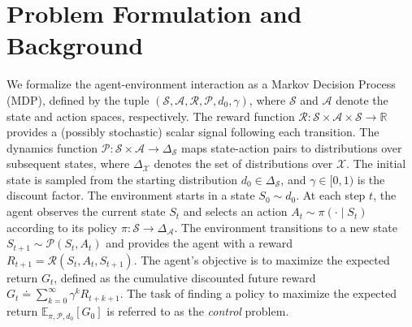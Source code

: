 \documentclass{article}
\newcommand{\stateSpace}{\mathscr{S}}
\newcommand{\actionSpace}{\mathscr{A}}
\newcommand{\rewardFunction}{\mathscr{R}}
\newcommand{\dynamics}{\mathscr{P}}
\newcommand{\startStateDistribution}{d_{0}}
\newcommand{\discount}{\gamma}
\newcommand{\distributionOver}[1]{\Delta_{#1}}
\begin{document}
\section{Problem Formulation and Background}

We formalize the agent-environment interaction as a Markov Decision Process (MDP), defined by the tuple
$(\stateSpace, \actionSpace, \rewardFunction, \dynamics, \startStateDistribution, \discount)$, where $\stateSpace$ and $\actionSpace$ denote the state and action spaces, respectively. The reward function
$\rewardFunction: \stateSpace \times \actionSpace \times \stateSpace \to \mathbb{R}$ provides a (possibly stochastic)
scalar signal following each transition. The dynamics function $\dynamics: \stateSpace \times \actionSpace \to \distributionOver{\stateSpace}$
maps state-action pairs to distributions over subsequent states, where $\distributionOver{\mathscr{X}}$ denotes
the set of distributions over $\mathscr{X}$. The initial state is sampled from the starting distribution
$\startStateDistribution \in \distributionOver{\stateSpace}$, and $\discount \in [0, 1)$ is the discount factor.
%
The environment starts in a state
$S_0 \sim \startStateDistribution$. At each step $t$, the agent observes
the current state $S_t$ and selects an action $A_t \sim \pi(\cdot \mid S_t)$ according to its policy $\pi:
\stateSpace \to \distributionOver{\actionSpace}$. The environment transitions to a new state $S_{t + 1} \sim
\dynamics(S_t, A_t)$ and provides the agent with a reward $R_{t+1} = \rewardFunction(S_t, A_t, S_{t + 1})$.
The agent's objective is to maximize the expected return $G_t$, defined as the cumulative discounted future reward $G_t
\doteq \sum_{k=0}^\infty \discount^k R_{t + k + 1}$. The task of finding a policy to maximize the expected return
$\mathbb{E}_{\pi, \dynamics, \startStateDistribution} \left[ G_0 \right]$ is referred to as the \textit{control}
problem.
\end{document}
